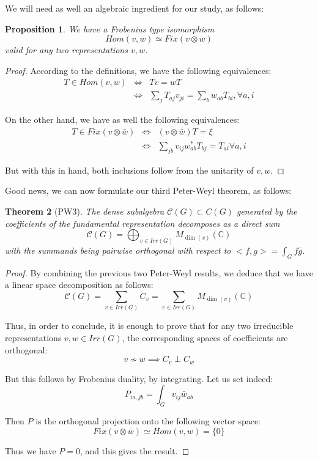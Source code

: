 \documentclass[12pt]{amsbook}
\newtheorem{theorem}{Theorem}[chapter]
\newtheorem{proposition}[theorem]{Proposition}
\begin{document}
We will need as well an algebraic ingredient for our study, as follows:


\begin{proposition}
We have a Frobenius type isomorphism
$$Hom(v,w)\simeq Fix(v\otimes\bar{w})$$
valid for any two representations $v,w$.
\end{proposition}

\begin{proof}
According to the definitions, we have the following equivalences:
\begin{eqnarray*}
T\in Hom(v,w)
&\iff&Tv=wT\\
&\iff&\sum_jT_{aj}v_{ji}=\sum_bw_{ab}T_{bi},\forall a,i
\end{eqnarray*}

On the other hand, we have as well the following equivalences:
\begin{eqnarray*}
T\in Fix(v\otimes\bar{w})
&\iff&(v\otimes\bar{w})T=\xi\\
&\iff&\sum_{jb}v_{ij}w_{ab}^*T_{bj}=T_{ai}\forall a,i
\end{eqnarray*}

But with this in hand, both inclusions follow from the unitarity of $v,w$.
\end{proof}

Good news, we can now formulate our third Peter-Weyl theorem, as follows:


\begin{theorem}[PW3]
The dense subalgebra $\mathcal C(G)\subset C(G)$ generated by the coefficients of the fundamental representation decomposes as a direct sum 
$$\mathcal C(G)=\bigoplus_{v\in Irr(G)}M_{\dim(v)}(\mathbb C)$$
with the summands being pairwise orthogonal with respect to $<f,g>=\int_Gf\bar{g}$.
\end{theorem}

\begin{proof}
By combining the previous two Peter-Weyl results, we deduce that we have a linear space decomposition as follows:
$$\mathcal C(G)
=\sum_{v\in Irr(G)}C_v
=\sum_{v\in Irr(G)}M_{\dim(v)}(\mathbb C)$$

Thus, in order to conclude, it is enough to prove that for any two irreducible representations $v,w\in Irr(G)$, the corresponding spaces of coefficients are orthogonal:
$$v\not\sim w\implies C_v\perp C_w$$ 

But this follows by Frobenius duality, by integrating. Let us set indeed:
$$P_{ia,jb}=\int_Gv_{ij}\bar{w}_{ab}$$

Then $P$ is the orthogonal projection onto the following vector space:
$$Fix(v\otimes\bar{w})
\simeq Hom(v,w)
=\{0\}$$

Thus we have $P=0$, and this gives the result.
\end{proof}
\end{document}
